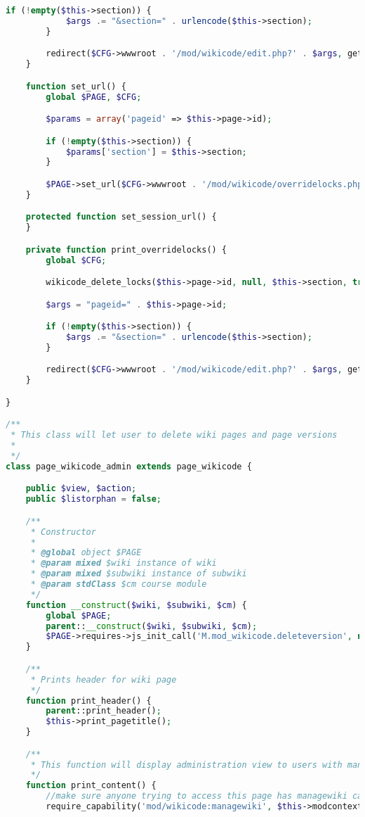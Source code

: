 \begin{lstlisting}[language=PHP]
        if (!empty($this->section)) {
            $args .= "&section=" . urlencode($this->section);
        }

        redirect($CFG->wwwroot . '/mod/wikicode/edit.php?' . $args, get_string('overridinglocks', 'wikicode'), 2);
    }

    function set_url() {
        global $PAGE, $CFG;

        $params = array('pageid' => $this->page->id);

        if (!empty($this->section)) {
            $params['section'] = $this->section;
        }

        $PAGE->set_url($CFG->wwwroot . '/mod/wikicode/overridelocks.php', $params);
    }

    protected function set_session_url() {
    }

    private function print_overridelocks() {
        global $CFG;

        wikicode_delete_locks($this->page->id, null, $this->section, true, true);

        $args = "pageid=" . $this->page->id;

        if (!empty($this->section)) {
            $args .= "&section=" . urlencode($this->section);
        }

        redirect($CFG->wwwroot . '/mod/wikicode/edit.php?' . $args, get_string('overridinglocks', 'wikicode'), 2);
    }

}

/**
 * This class will let user to delete wiki pages and page versions
 *
 */
class page_wikicode_admin extends page_wikicode {

    public $view, $action;
    public $listorphan = false;

    /**
     * Constructor
     *
     * @global object $PAGE
     * @param mixed $wiki instance of wiki
     * @param mixed $subwiki instance of subwiki
     * @param stdClass $cm course module
     */
    function __construct($wiki, $subwiki, $cm) {
        global $PAGE;
        parent::__construct($wiki, $subwiki, $cm);
        $PAGE->requires->js_init_call('M.mod_wikicode.deleteversion', null, true);
    }

    /**
     * Prints header for wiki page
     */
    function print_header() {
        parent::print_header();
        $this->print_pagetitle();
    }

    /**
     * This function will display administration view to users with managewiki capability
     */
    function print_content() {
        //make sure anyone trying to access this page has managewiki capabilities
        require_capability('mod/wikicode:managewiki', $this->modcontext, NULL, true, 'noviewpagepermission', 'wikicode');


\end{lstlisting}
